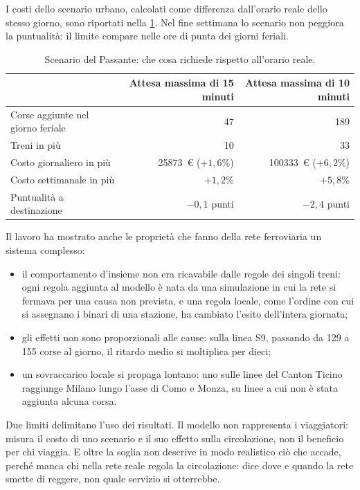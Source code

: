 I costi dello scenario urbano, calcolati come differenza dall'orario reale dello stesso giorno, sono riportati nella \cref{tab:conclusioni-costi}. Nel fine settimana lo scenario non peggiora la puntualità: il limite compare nelle ore di punta dei giorni feriali.

\begin{table}[H]
	\centering
	\caption{Scenario del Passante: che cosa richiede rispetto all'orario reale.}
	\label{tab:conclusioni-costi}
	\begin{tabularx}{\textwidth}{Xrr}
		\toprule
		 & Attesa massima di 15 minuti & Attesa massima di 10 minuti \\
		\midrule
		Corse aggiunte nel giorno feriale & 47 & 189 \\
		Treni in più & 10 & 33 \\
		Costo giornaliero in più & \SI{25873}{\euro} ($+1{,}6\%$) & \SI{100333}{\euro} ($+6{,}2\%$) \\
		Costo settimanale in più & $+1{,}2\%$ & $+5{,}8\%$ \\
		Puntualità a destinazione & $-0{,}1$ punti & $-2{,}4$ punti \\
		\bottomrule
	\end{tabularx}
\end{table}

Il lavoro ha mostrato anche le proprietà che fanno della rete ferroviaria un sistema complesso:
\begin{itemize}
	\item il comportamento d'insieme non era ricavabile dalle regole dei singoli treni: ogni regola aggiunta al modello è nata da una simulazione in cui la rete si fermava per una causa non prevista, e una regola locale, come l'ordine con cui si assegnano i binari di una stazione, ha cambiato l'esito dell'intera giornata;
	\item gli effetti non sono proporzionali alle cause: sulla linea S9, passando da 129 a 155 corse al giorno, il ritardo medio si moltiplica per dieci;
	\item un sovraccarico locale si propaga lontano: uno sulle linee del Canton Ticino raggiunge Milano lungo l'asse di Como e Monza, su linee a cui non è stata aggiunta alcuna corsa.
\end{itemize}

Due limiti delimitano l'uso dei risultati. Il modello non rappresenta i viaggiatori: misura il costo di uno scenario e il suo effetto sulla circolazione, non il beneficio per chi viaggia. E oltre la soglia non descrive in modo realistico ciò che accade, perché manca chi nella rete reale regola la circolazione: dice dove e quando la rete smette di reggere, non quale servizio si otterrebbe.
